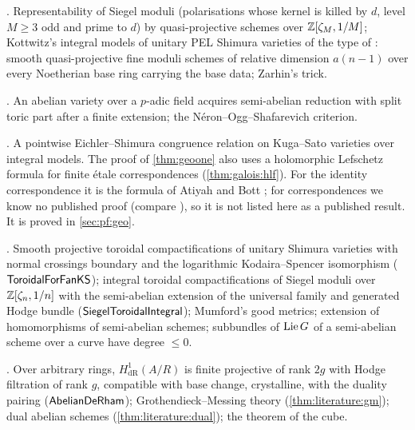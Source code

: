 \begin{description}[leftmargin=0pt,itemsep=1pt,parsep=0pt,font=\normalfont\itshape]
\item[Moduli spaces] \cite{MumfordFogartyKirwan1994,Kottwitz1992,HarrisTaylor2001,Zarhin1977}.
  Representability of Siegel moduli (polarisations whose kernel is killed by $d$, level $M\ge3$ odd
  and prime to $d$) by quasi-projective schemes over $\mathbb{Z}[\zeta_M,1/M]$; Kottwitz's integral models of unitary PEL Shimura varieties of the type of
  \cite{HarrisTaylor2001}: smooth quasi-projective fine moduli schemes of relative dimension $a(n-1)$
  over every Noetherian base ring carrying the base data; Zarhin's trick.
   
\item[Semistable reduction] \cite{Grothendieck1972,SerreTate1968}.  An abelian variety over a
  $p$-adic field acquires semi-abelian reduction with split toric part after a finite extension;
  the N\'eron--Ogg--Shafarevich criterion.  
\item[Congruence relation] \cite{Wedhorn2000}.  A pointwise Eichler--Shimura congruence relation on
  Kuga--Sato varieties over integral models.  
  The proof of \cref{thm:geoone} also uses a holomorphic Lefschetz formula for finite \'etale correspondences
  (\cref{thm:galois:hlf}). For the identity correspondence it is the formula of Atiyah and Bott
  \cite{AtiyahBott1968}; for correspondences we know no published proof (compare \cite{Tu2023}), so it is not
  listed here as a published result. It is proved in \cref{sec:pf:geo}.
\item[Toroidal compactifications]
  \cite{AshMumfordRapoportTai1975,FaltingsChai1990,Lan2013,Mumford1977,MoretBailly1985}.  Smooth
  projective toroidal compactifications of unitary Shimura varieties with normal crossings boundary
  and the logarithmic Kodaira--Spencer isomorphism ($\mathsf{ToroidalForFanKS}$); integral toroidal
  compactifications of Siegel moduli over $\mathbb{Z}[\zeta_n,1/n]$ with the semi-abelian extension of the
  universal family and generated Hodge bundle ($\mathsf{SiegelToroidalIntegral}$); Mumford's good
  metrics; extension of homomorphisms of semi-abelian schemes; subbundles of $\operatorname{Lie} G$ of a
  semi-abelian scheme over a curve have degree $\le0$.  
\item[Abelian schemes] \cite{Mumford1970,BerthelotBreenMessing1982,Messing1972}.  Over arbitrary
  rings, $H^1_{\mathrm{dR}}(A/R)$ is finite projective of rank $2g$ with Hodge filtration of rank
  $g$, compatible with base change, crystalline, with the duality pairing
  ($\mathsf{AbelianDeRham}$); Grothendieck--Messing theory (\cref{thm:literature:gm}); dual abelian
  schemes (\cref{thm:literature:dual}); the theorem of the cube.
\end{description}

